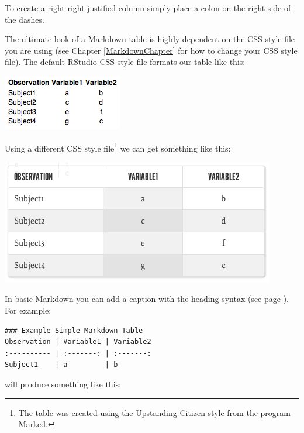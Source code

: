 \noindent To create a right-right justified column simply place a colon on the right side of the dashes. 

The ultimate look of a Markdown table is highly dependent on the CSS style file you are using (see Chapter \ref{MarkdownChapter} for how to change your CSS style file). The default RStudio CSS style file formats our table like this:

\includegraphics[scale = 0.6]{Children/Chapter9/images9/RStudioDefaultTableExample.png}

\noindent Using a different CSS style file\footnote{The table was created using the Upstanding Citizen style from the program Marked.} we can get something like this:

\includegraphics[scale = 0.6]{Children/Chapter9/images9/MarkedTableExample.png}

\noindent In basic Markdown you can add a caption with the heading syntax (see page \pageref{headings, Markdown}). For example:

\begin{knitrout}
\color{fgcolor}\begin{kframe}
\begin{verbatim}
### Example Simple Markdown Table
Observation | Variable1 | Variable2 
:---------- | :-------: | :-------: 
Subject1    | a         | b         
\end{verbatim}
\end{kframe}
\end{knitrout}


\noindent will produce something like this:

